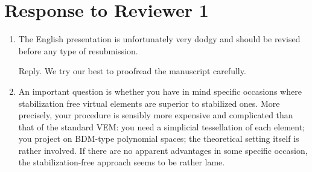 \documentclass[10pt]{amsart}
\theoremstyle{definition}
\theoremstyle{remark}
\begin{document}
\section{Response to Reviewer 1}
\begin{enumerate}[1.]

\item \textsf{The English presentation is unfortunately very dodgy and should be revised before any type of resubmission.}

\smallskip \noindent \textcolor[rgb]{1.00,0.00,0.00}{Reply.}
We try our best to proofread the manuscript carefully.


\medskip

\item \textsf{An important question is whether you have in mind specific occasions where stabilization free virtual elements are superior to stabilized ones. More precisely, your procedure is sensibly more expensive and complicated than that of the standard VEM: you need a simplicial tessellation of each element; you project on BDM-type polynomial spaces; the theoretical setting itself is rather involved. If there are no apparent advantages in some specific occasion, the stabilization-free approach seems to be rather lame.}


\end{enumerate}
\end{document}
